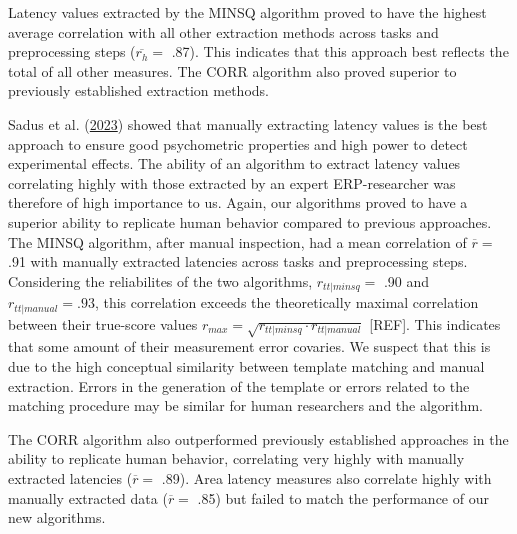 \documentclass[
  man]{apa7}
\begin{document}
Latency values extracted by the MINSQ algorithm proved to have the highest average correlation with all other extraction methods across tasks and preprocessing steps (\(\overline{r_{h}} =\) .87). This indicates that this approach best reflects the total of all other measures. The CORR algorithm also proved superior to previously established extraction methods.

Sadus et al. (\protect\hyperlink{ref-sadus2023multiverse}{2023}) showed that manually extracting latency values is the best approach to ensure good psychometric properties and high power to detect experimental effects. The ability of an algorithm to extract latency values correlating highly with those extracted by an expert ERP-researcher was therefore of high importance to us.
Again, our algorithms proved to have a superior ability to replicate human behavior compared to previous approaches. The MINSQ algorithm, after manual inspection, had a mean correlation of \(\overline{r} =\) .91 with manually extracted latencies across tasks and preprocessing steps. Considering the reliabilites of the two algorithms, \(r_{tt|minsq} =\) .90 and \(r_{tt|manual} = .93\), this correlation exceeds the theoretically maximal correlation between their true-score values \(r_{max} = \sqrt{r_{tt|minsq} \cdot r_{tt|manual}}\) {[}REF{]}. This indicates that some amount of their measurement error covaries. We suspect that this is due to the high conceptual similarity between template matching and manual extraction. Errors in the generation of the template or errors related to the matching procedure may be similar for human researchers and the algorithm.

The CORR algorithm also outperformed previously established approaches in the ability to replicate human behavior, correlating very highly with manually extracted latencies (\(\overline{r} =\) .89). Area latency measures also correlate highly with manually extracted data (\(\overline{r} =\) .85) but failed to match the performance of our new algorithms.
\end{document}
